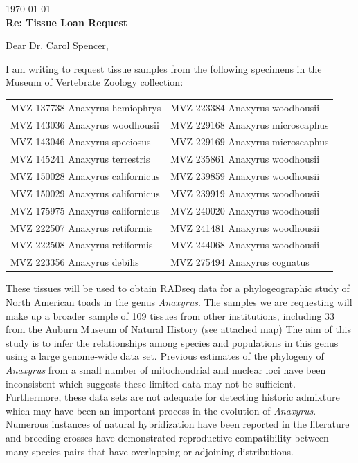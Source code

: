 \documentclass[fontsize=11pt,]{article}
\begin{document}
\vspace*{-3\baselineskip}
\BgThispage
\hfill \today\\
\vspace{2mm}
\textbf{Re: Tissue Loan Request}\\
\vspace{2mm}

Dear Dr. Carol Spencer, \\

\vspace{2mm}

I am writing to request tissue samples from the following specimens in the
Museum of Vertebrate Zoology collection:

\vspace*{-2mm}

\begin{table}[h]
\begin{tabular}{ll}
MVZ 137738 Anaxyrus hemiophrys  &  MVZ 223384 Anaxyrus woodhousii   \\
MVZ 143036 Anaxyrus woodhousii  &  MVZ 229168 Anaxyrus microscaphus   \\
MVZ 143046 Anaxyrus speciosus  &  MVZ 229169 Anaxyrus microscaphus   \\
MVZ 145241 Anaxyrus terrestris  &  MVZ 235861 Anaxyrus woodhousii   \\
MVZ 150028 Anaxyrus californicus  &  MVZ 239859 Anaxyrus woodhousii   \\
MVZ 150029 Anaxyrus californicus  &  MVZ 239919 Anaxyrus woodhousii   \\
MVZ 175975 Anaxyrus californicus  &  MVZ 240020 Anaxyrus woodhousii   \\
MVZ 222507 Anaxyrus retiformis  &  MVZ 241481 Anaxyrus woodhousii   \\
MVZ 222508 Anaxyrus retiformis  &  MVZ 244068 Anaxyrus woodhousii   \\
MVZ 223356 Anaxyrus debilis  &  MVZ 275494 Anaxyrus cognatus   \\
\end{tabular}
\end{table}

\vspace*{-2mm}

These tissues will be used to obtain RADseq data for a phylogeographic study of
North American toads in the genus \textit{Anaxyrus}.
The samples we are requesting will make up a broader sample of 109 tissues from 
other institutions, including 33 from the Auburn Museum of Natural History (see attached map)
The aim of this study is to infer the relationships among species and
populations in this genus using a large genome-wide data set.
Previous estimates of the phylogeny of \textit{Anaxyrus} 
from a small number of mitochondrial and nuclear loci have been inconsistent  
which suggests these limited data may not be sufficient.
Furthermore, these data sets are not adequate for detecting historic
admixture which may have been an important process in the evolution of
\textit{Anaxyrus}.
Numerous instances of natural hybridization have been reported in the literature
and breeding crosses have demonstrated reproductive compatibility between many
species pairs that have overlapping or adjoining distributions. \\
\end{document}
